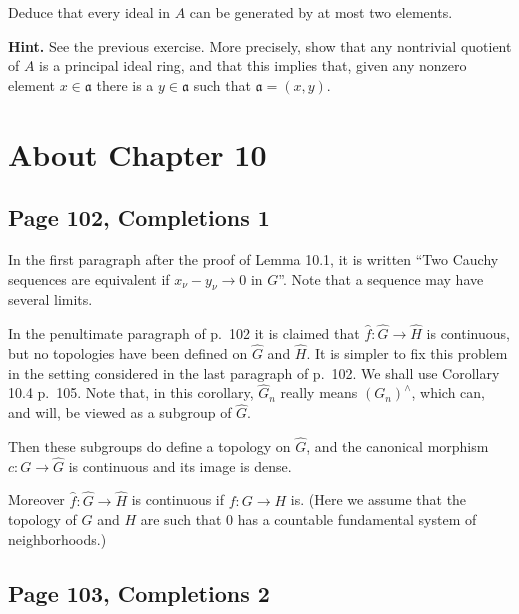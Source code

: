 \documentclass[parskip=half,fontsize=12pt]{scrartcl}%
\newcommand{\mf}{\mathfrak}
\newcommand{\aaa}{\mf a}
\begin{document}
Deduce that every ideal in $A$ can be generated by at most two elements. 

\textbf{Hint.} See the previous exercise. More precisely, show that any nontrivial quotient of $A$ is a principal ideal ring, and that this implies that, given any nonzero element $x\in\aaa$ there is a $y\in\aaa$ such that $\aaa=(x,y)$. 

\section{About Chapter 10}%

\subsection{Page 102, Completions 1}%

In the first paragraph after the proof of Lemma 10.1, it is written ``Two Cauchy sequences are equivalent if $x_\nu-y_\nu\to0$ in $G$''. Note that a sequence may have several limits.%

In the penultimate paragraph of p.~102 it is claimed that $\widehat f:\widehat G\to\widehat H$ is continuous, but no topologies have been defined on $\widehat G$ and $\widehat H$. It is simpler to fix this problem in the setting considered in the last paragraph of p.~102. We shall use Corollary 10.4 p.~105. Note that, in this corollary, $\widehat G_n$ really means $(G_n)^\wedge$, which can, and will, be viewed as a subgroup of $\widehat G$. 

Then these subgroups do define a topology on $\widehat G$, and the canonical morphism $c:G\to\widehat G$ is continuous and its image is dense. 

Moreover $\widehat f:\widehat G\to\widehat H$ is continuous if $f:G\to H$ is. (Here we assume that the topology of $G$ and $H$ are such that $0$ has a countable fundamental system of neighborhoods.)


\subsection{Page 103, Completions 2}%
\end{document}
